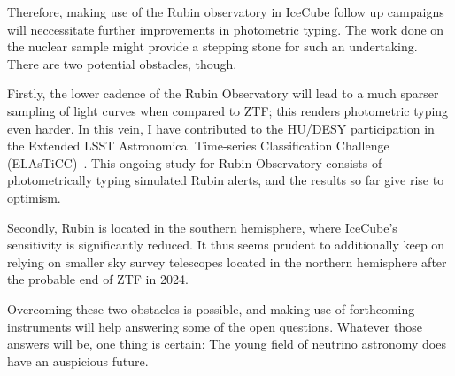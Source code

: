 Therefore, making use of the Rubin observatory in IceCube follow up campaigns will neccessitate further improvements in photometric typing. The work done on the nuclear sample might provide a stepping stone for such an undertaking. There are two potential obstacles, though.

Firstly, the lower cadence of the Rubin Observatory will lead to a much sparser sampling of light curves when compared to ZTF; this renders photometric typing even harder. In this vein, I have contributed to the HU/DESY participation in the Extended LSST Astronomical Time-series Classification Challenge (ELAsTiCC)~. This ongoing study for Rubin Observatory consists of photometrically typing simulated Rubin alerts, and the results so far give rise to optimism.

Secondly, Rubin is located in the southern hemisphere, where IceCube's sensitivity is significantly reduced. It thus seems prudent to additionally keep on relying on smaller sky survey telescopes located in the northern hemisphere after the probable end of ZTF in 2024.

Overcoming these two obstacles is possible, and making use of forthcoming instruments will help answering some of the open questions. Whatever those answers will be, one thing is certain: The young field of neutrino astronomy does have an auspicious future.